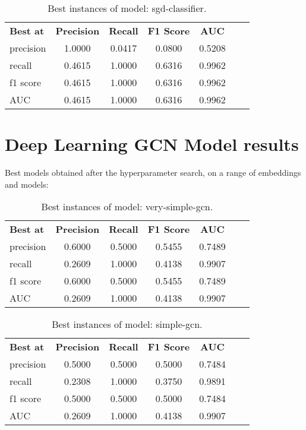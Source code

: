 \begin{table}[H]
    \centering
    \caption{Best instances of model: sgd-classifier.}
    \begin{tabular}{lcccccc}
      \textbf{Best at}  & \textbf{Precision} & \textbf{Recall} & \textbf{F1 Score} & \textbf{AUC} \\
        precision & 1.0000 & 0.0417 & 0.0800 & 0.5208 \\
        recall & 0.4615 & 1.0000 & 0.6316 & 0.9962 \\
        f1 score & 0.4615 & 1.0000 & 0.6316 & 0.9962 \\
        AUC & 0.4615 & 1.0000 & 0.6316 & 0.9962 \\
    \end{tabular}
\end{table}


\section{Deep Learning GCN Model results}
Best models obtained after the hyperparameter search, on a range of embeddings and models:

\begin{table}[H]
    \centering
    \caption{Best instances of model: very-simple-gcn.}
    \begin{tabular}{lcccccc}
      \textbf{Best at}  & \textbf{Precision} & \textbf{Recall} & \textbf{F1 Score} & \textbf{AUC} \\
        precision & 0.6000 & 0.5000 & 0.5455 & 0.7489 \\
        recall & 0.2609 & 1.0000 & 0.4138 & 0.9907 \\
        f1 score & 0.6000 & 0.5000 & 0.5455 & 0.7489 \\
        AUC & 0.2609 & 1.0000 & 0.4138 & 0.9907 \\
    \end{tabular}
\end{table}

\begin{table}[H]
    \centering
    \caption{Best instances of model: simple-gcn.}
    \begin{tabular}{lcccccc}
      \textbf{Best at}  & \textbf{Precision} & \textbf{Recall} & \textbf{F1 Score} & \textbf{AUC} \\
        precision & 0.5000 & 0.5000 & 0.5000 & 0.7484 \\
        recall & 0.2308 & 1.0000 & 0.3750 & 0.9891 \\
        f1 score & 0.5000 & 0.5000 & 0.5000 & 0.7484 \\
        AUC & 0.2609 & 1.0000 & 0.4138 & 0.9907 \\
    \end{tabular}
\end{table}

